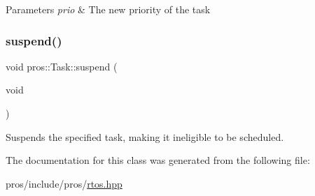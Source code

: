 \begin{DoxyParams}{Parameters}
{\em prio} & The new priority of the task \\
\hline
\end{DoxyParams}
\mbox{\label{classpros_1_1Task_a89005762dcd3026c953ae5eedd7ecd97}} 
\subsubsection{\texorpdfstring{suspend()}{suspend()}}
{\footnotesize\ttfamily void pros\+::\+Task\+::suspend (\begin{DoxyParamCaption}\item[{void}]{ }\end{DoxyParamCaption})}



Suspends the specified task, making it ineligible to be scheduled. 



The documentation for this class was generated from the following file\+:\begin{DoxyCompactItemize}
\item 
pros/include/pros/\hyperlink{rtos_8hpp}{rtos.\+hpp}\end{DoxyCompactItemize}
